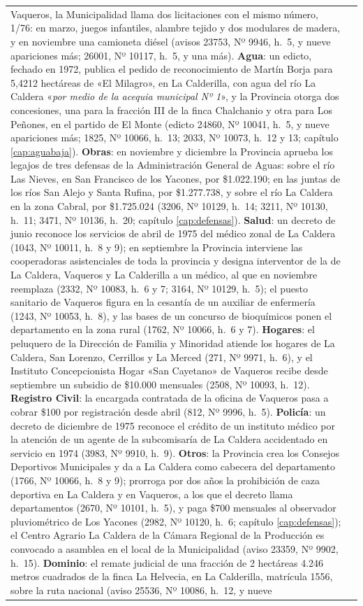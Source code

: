 \begin{longtable}{@{}p{2.7cm}p{10.3cm}@{}}
Vaqueros, la Municipalidad llama dos licitaciones con el mismo número, 1/76: en marzo, juegos infantiles, alambre tejido y dos modulares de madera, y en noviembre una camioneta diésel (avisos 23753, Nº 9946, h.\ 5, y nueve apariciones más; 26001, Nº 10117, h.\ 5, y una más). \textbf{Agua}: un edicto, fechado en 1972, publica el pedido de reconocimiento de Martín Borja para 5,4212 hectáreas de «El Milagro», en La Calderilla, con agua del río La Caldera «\textit{por medio de la acequia municipal Nº 1}», y la Provincia otorga dos concesiones, una para la fracción III de la finca Chalchanio y otra para Los Peñones, en el partido de El Monte (edicto 24860, Nº 10041, h.\ 5, y nueve apariciones más; 1825, Nº 10066, h.\ 13; 2033, Nº 10073, h.\ 12 y 13; capítulo \ref{cap:aguabaja}). \textbf{Obras}: en noviembre y diciembre la Provincia aprueba los legajos de tres defensas de la Administración General de Aguas: sobre el río Las Nieves, en San Francisco de los Yacones, por \$1.022.190; en las juntas de los ríos San Alejo y Santa Rufina, por \$1.277.738, y sobre el río La Caldera en la zona Cabral, por \$1.725.024 (3206, Nº 10129, h.\ 14; 3211, Nº 10130, h.\ 11; 3471, Nº 10136, h.\ 20; capítulo \ref{cap:defensas}). \textbf{Salud}: un decreto de junio reconoce los servicios de abril de 1975 del médico zonal de La Caldera (1043, Nº 10011, h.\ 8 y 9); en septiembre la Provincia interviene las cooperadoras asistenciales de toda la provincia y designa interventor de la de La Caldera, Vaqueros y La Calderilla a un médico, al que en noviembre reemplaza (2332, Nº 10083, h.\ 6 y 7; 3164, Nº 10129, h.\ 5); el puesto sanitario de Vaqueros figura en la cesantía de un auxiliar de enfermería (1243, Nº 10053, h.\ 8), y las bases de un concurso de bioquímicos ponen el departamento en la zona rural (1762, Nº 10066, h.\ 6 y 7). \textbf{Hogares}: el peluquero de la Dirección de Familia y Minoridad atiende los hogares de La Caldera, San Lorenzo, Cerrillos y La Merced (271, Nº 9971, h.\ 6), y el Instituto Concepcionista Hogar «San Cayetano» de Vaqueros recibe desde septiembre un subsidio de \$10.000 mensuales (2508, Nº 10093, h.\ 12). \textbf{Registro Civil}: la encargada contratada de la oficina de Vaqueros pasa a cobrar \$100 por registración desde abril (812, Nº 9996, h.\ 5). \textbf{Policía}: un decreto de diciembre de 1975 reconoce el crédito de un instituto médico por la atención de un agente de la subcomisaría de La Caldera accidentado en servicio en 1974 (3983, Nº 9910, h.\ 9). \textbf{Otros}: la Provincia crea los Consejos Deportivos Municipales y da a La Caldera como cabecera del departamento (1766, Nº 10066, h.\ 8 y 9); prorroga por dos años la prohibición de caza deportiva en La Caldera y en Vaqueros, a los que el decreto llama departamentos (2670, Nº 10101, h.\ 5), y paga \$700 mensuales al observador pluviométrico de Los Yacones (2982, Nº 10120, h.\ 6; capítulo \ref{cap:defensas}); el Centro Agrario La Caldera de la Cámara Regional de la Producción es convocado a asamblea en el local de la Municipalidad (aviso 23359, Nº 9902, h.\ 15). \textbf{Dominio}: el remate judicial de una fracción de 2 hectáreas 4.246 metros cuadrados de la finca La Helvecia, en La Calderilla, matrícula 1556, sobre la ruta nacional (aviso 25536, Nº 10086, h.\ 12, y nueve 
\end{longtable}
